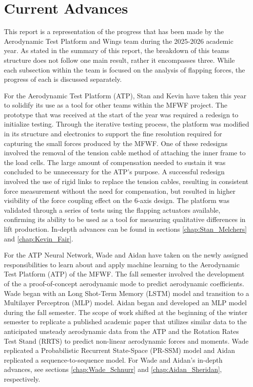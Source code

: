 \chapter{Current Advances} 
\sffamily
\label{chap:Literature_Review}

This report is a representation of the progress that has been made by the Aerodynamic Test Platform and Wings team during the 2025-2026 academic year. As stated in the summary of this report, the breakdown of this teams structure does not follow one main result, rather it encompasses three. While each subsection within the team is focused on the analysis of flapping forces, the progress of each is discussed separately.

\indent For the Aerodynamic Test Platform (ATP), Stan and Kevin have taken this year to solidify its use as a tool for other teams within the MFWF project. The prototype that was received at the start of the year was required a redesign to initialize testing. Through the iterative testing process, the platform was modified in its structure and electronics to support the fine resolution required for capturing the small forces produced by the MFWF. One of these redesigns involved the removal of the tension cable method of attaching the inner frame to the load cells. The large amount of compensation needed to sustain it was concluded to be unnecessary for the ATP's purpose. A successful redesign involved the use of rigid links to replace the tension cables, resulting in consistent force measurement without the need for compensation, but resulted in higher visibility of the force coupling effect on the 6-axis design. The platform was validated through a series of tests using the flapping actuators available, confirming its ability to be used as a tool for measuring qualitative differences in lift production. In-depth advances can be found in sections \ref{chap:Stan_Melchers} and \ref{chap:Kevin_Fair}.

\indent For the ATP Neural Network, Wade and Aidan have taken on the newly assigned responsibilities to learn about and apply machine learning to the Aerodynamic Test Platform (ATP) of the MFWF. The fall semester involved the development of the a proof-of-concept aerodynamic mode to predict aerodynamic coefficients. Wade began with an Long Shot-Term Memory (LSTM) model and transition to a Multilayer Perceptron (MLP) model. Aidan began and developed an MLP model during the fall semester. The scope of work shifted at the beginning of the winter semester to replicate a published academic paper that utilizes similar data to the anticipated unsteady aerodynamic data from the ATP and the Rotation Rates Test Stand (RRTS) to predict non-linear aerodynamic forces and moments. Wade replicated a Probabilistic Recurrent State-Space (PR-SSM) model and Aidan replicated a sequence-to-sequence model. For Wade and Aidan's in-depth advances, see sections \ref{chap:Wade_Schnurr} and \ref{chap:Aidan_Sheridan}, respectively.

